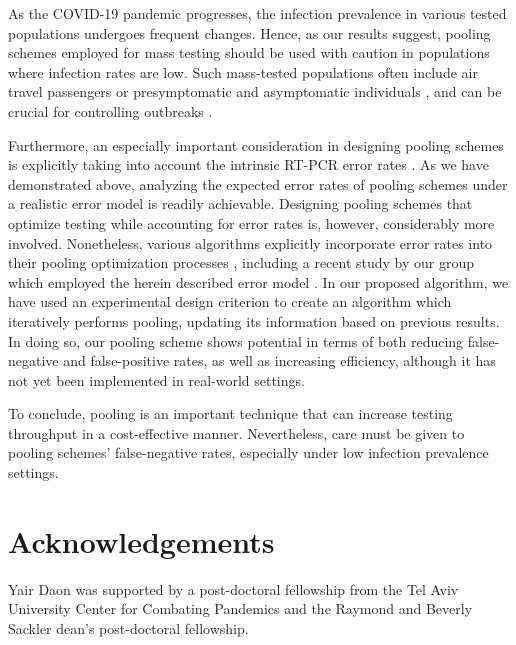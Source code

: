 \documentclass{article}
\begin{document}
As the COVID-19 pandemic progresses, the infection prevalence in
various tested populations undergoes frequent changes. Hence, as our
results suggest, pooling schemes employed for mass testing should be
used with caution in populations where infection rates are low. Such
mass-tested populations often include air travel passengers \cite{JTM}
or presymptomatic and asymptomatic individuals \cite{RobinHood}, and
can be crucial for controlling outbreaks \cite{MinaScience}.

Furthermore, an especially important consideration in designing
pooling schemes is explicitly taking into account the intrinsic RT-PCR
error rates . As we have demonstrated above, analyzing the expected
error rates of pooling schemes under a realistic error model is
readily achievable. Designing pooling schemes that optimize testing
while accounting for error rates is, however, considerably more
involved.  Nonetheless, various algorithms explicitly incorporate
error rates into their pooling optimization processes \cite{Kim,
  OptimalDorfmanPool}, including a recent study by our group which
employed the herein described error model \cite{DOPE}.  In our
proposed algorithm, we have used an experimental design criterion to
create an algorithm which iteratively performs pooling, updating its
information based on previous results. In doing so, our pooling scheme
shows potential in terms of both reducing false-negative and
false-positive rates, as well as increasing efficiency, although it
has not yet been implemented in real-world settings.

To conclude, pooling is an important technique that can increase
testing throughput in a cost-effective manner. Nevertheless, care must
be given to pooling schemes' false-negative rates, especially under
low infection prevalence settings.

\section*{Acknowledgements}
Yair Daon was supported by a post-doctoral fellowship from the Tel
Aviv University Center for Combating Pandemics and the Raymond and
Beverly Sackler dean's post-doctoral fellowship.



\end{document}
